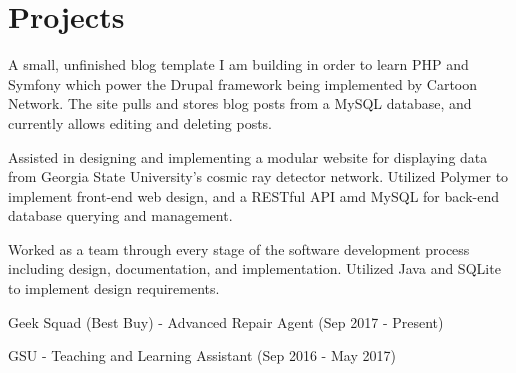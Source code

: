 \documentclass[]{deedy-resume-openfont}
\begin{document}
\begin{minipage}[t]{0.66\textwidth}

\section{Projects}
A small, unfinished blog template I am building in order to learn PHP and Symfony which power the Drupal framework being implemented by Cartoon Network. The site pulls and stores blog posts from a MySQL database, and currently allows editing and deleting posts.
\sectionsep

Assisted in designing and implementing a modular website for displaying data from Georgia State University's cosmic ray detector network. Utilized Polymer to implement front-end web design, and a RESTful API amd MySQL for back-end database querying and management.
\sectionsep

Worked as a team through every stage of the software development process including design, documentation, and implementation. Utilized Java and SQLite to implement design requirements.
\sectionsep


\begin{tightemize}
\item Geek Squad (Best Buy) - Advanced Repair Agent (Sep 2017 - Present)
\item GSU - Teaching and Learning Assistant (Sep 2016 - May 2017)
\end{tightemize}
\sectionsep

\end{minipage} 
\end{document}
